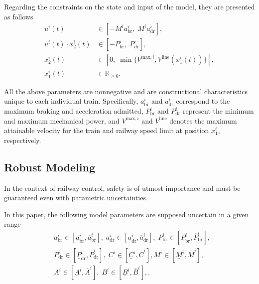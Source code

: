 \documentclass[letterpaper, 10 pt, conference]{ieeeconf}
\theoremstyle{definition}
\theoremstyle{nopoint}
\begin{document}
Regarding the constraints on the state and input of the model, they are presented as follows
%
\begin{subequations} \label{eq:modelConstraints}
    \begin{align}
        u^i(t) &\in \left[-M^i a_{\mathrm{br}}^i, \;M^i a_{\mathrm{dr}}^i \right], \label{eq:lim1} \\
         u^i(t) \cdot x_2^i(t)&\in \left[-P^i_{\mathrm{br}}, \;P^i_{\mathrm{dr}}\right], \label{eq:lim2} \\
       x_2^i(t) &\in \left[0, \;\min\{V^{\mathrm{max},i},V^{\mathrm{line}}(x_1^i(t))\}\right], \label{eq:lim5} \\
        x_1^i(t) &\in \mathbb{R}_{\geq0}. \label{eq:lim4}  
    \end{align}
\end{subequations}
%

All the above parameters are nonnegative and are constructional characteristics unique to each individual train.  Specifically,  $a_{\mathrm{br}}^i $ and $a_{\mathrm{dr}}^i$ correspond to the maximum braking and acceleration admitted, $P^i_{\mathrm{br}}$ and $P^i_{\mathrm{dr}}$ represent the minimum and maximum mechanical power, and $V^{\mathrm{max},i}$ and $V^{\mathrm{line}}$ denotes the maximum attainable velocity for the train and railway speed limit at position $x_1^i$, respectively.



\subsection{Robust Modeling}
\label{subsec:robustModeling}
%
In the context of railway control, safety is of utmost importance and must be guaranteed even with parametric uncertainties. 

In this paper, the following model parameters are supposed uncertain in a given range
%
\begin{eqnarray}\label{eq:train_intervals}
   &a_{\mathrm{br}}^i \in [\underline{a}_{\mathrm{br}}^i , \overline{a}_{\mathrm{br}}^i], \;
      a_{\mathrm{dr}}^i \in [\underline{a}_{\mathrm{dr}}^i , \overline{a}_{\mathrm{dr}}^i],  \;
   P^i_{\mathrm{br}} \in [\underline{P}_{\mathrm{br}}^i , \overline{P}_{\mathrm{br}}^i]  , \nonumber \\
   &P^i_{\mathrm{dr}} \in [\underline{P}_{\mathrm{dr}}^i , \overline{P}_{\mathrm{dr}}^i],   \;
   C^i \in [\underline{C}^i , \overline{C}^i ] , M^i \in [\underline{M}^i , \overline{M}^i], \;\nonumber \\
    & A^i \in [\underline{A}^i , \overline{A}^i] ,  \;
     B^i \in [\underline{B}^i , \overline{B}^i] , .
\end{eqnarray}
\end{document}
